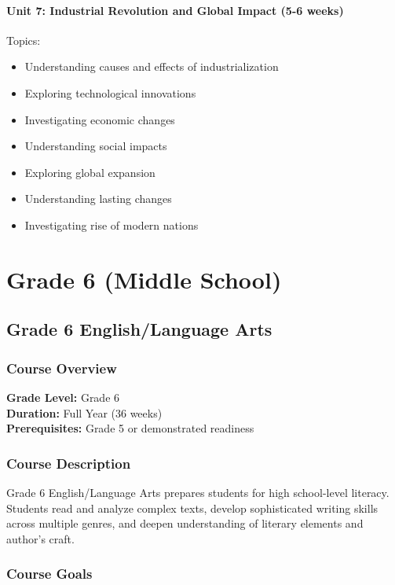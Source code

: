 \documentclass[11pt,letterpaper]{report}
\begin{document}
\subsection{Unit 7: Industrial Revolution and Global Impact (5-6 weeks)}

Topics:
\begin{itemize}
\item Understanding causes and effects of industrialization
\item Exploring technological innovations
\item Investigating economic changes
\item Understanding social impacts
\item Exploring global expansion
\item Understanding lasting changes
\item Investigating rise of modern nations
\end{itemize}

\clearpage

\part{Grade 6 (Middle School)}

\chapter{Grade 6 English/Language Arts}

\section{Course Overview}

\textbf{Grade Level:} Grade 6\\
\textbf{Duration:} Full Year (36 weeks)\\
\textbf{Prerequisites:} Grade 5 or demonstrated readiness

\section{Course Description}

Grade 6 English/Language Arts prepares students for high school-level literacy. Students read and analyze complex texts, develop sophisticated writing skills across multiple genres, and deepen understanding of literary elements and author's craft.

\section{Course Goals}
\end{document}
